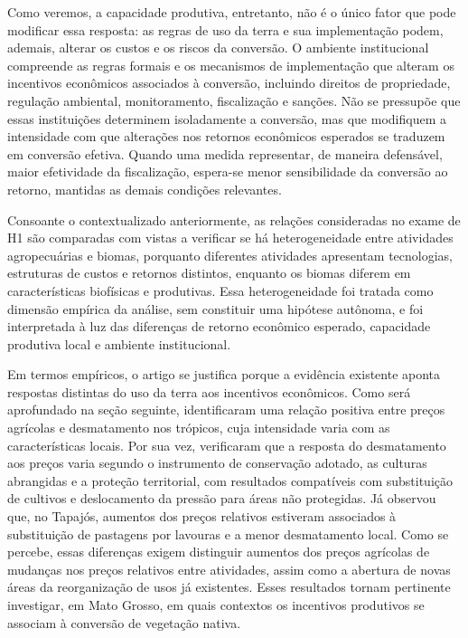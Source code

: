 Como veremos, a capacidade produtiva, entretanto, não é o único fator que pode modificar essa resposta: as regras de uso da terra e sua implementação podem, ademais, alterar os custos e os riscos da conversão. O ambiente institucional compreende as regras formais e os mecanismos de implementação que alteram os incentivos econômicos associados à conversão, incluindo direitos de propriedade, regulação ambiental, monitoramento, fiscalização e sanções. Não se pressupõe que essas instituições determinem isoladamente a conversão, mas que modifiquem a intensidade com que alterações nos retornos econômicos esperados se traduzem em conversão efetiva. Quando uma medida representar, de maneira defensável, maior efetividade da fiscalização, espera-se menor sensibilidade da conversão ao retorno, mantidas as demais condições relevantes. 

Consoante o contextualizado anteriormente, as relações consideradas no exame de H1 são comparadas com vistas a verificar se há heterogeneidade entre atividades agropecuárias e biomas, porquanto diferentes atividades apresentam tecnologias, estruturas de custos e retornos distintos, enquanto os biomas diferem em características biofísicas e produtivas. Essa heterogeneidade foi tratada como dimensão empírica da análise, sem constituir uma hipótese autônoma, e foi interpretada à luz das diferenças de retorno econômico esperado, capacidade produtiva local e ambiente institucional.

Em termos empíricos, o artigo se justifica porque a evidência existente aponta respostas distintas do uso da terra aos incentivos econômicos. Como será aprofundado na seção seguinte,  identificaram uma relação positiva entre preços agrícolas e desmatamento nos trópicos, cuja intensidade varia com as características locais. Por sua vez,  verificaram que a resposta do desmatamento aos preços varia segundo o instrumento de conservação adotado, as culturas abrangidas e a proteção territorial, com resultados compatíveis com substituição de cultivos e deslocamento da pressão para áreas não protegidas. Já  observou que, no Tapajós, aumentos dos preços relativos estiveram associados à substituição de pastagens por lavouras e a menor desmatamento local. Como se percebe, essas diferenças exigem distinguir aumentos dos preços agrícolas de mudanças nos preços relativos entre atividades, assim como a abertura de novas áreas da reorganização de usos já existentes. Esses resultados tornam pertinente investigar, em Mato Grosso, em quais contextos os incentivos produtivos se associam à conversão de vegetação nativa. 

